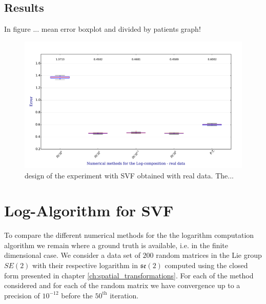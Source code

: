 \subsection{Results}
In figure ... mean error boxplot and divided by patients graph!

\begin{figure}[!ht]
	\hspace{-1.0cm}
	\includegraphics[scale=0.5]{figures/svf_log_composition_boxplot_real_data.pdf}
	\caption{design of the experiment with SVF obtained with real data. The... }
	\label{fig:svf_log_composition_boxplot_real_data}
\end{figure}



\section{Log-Algorithm for SVF}

To compare the different numerical methods for the the logarithm computation algorithm we remain where a ground truth is available, i.e. in the finite dimensional case. We consider a data set of $200$ random matrices in the Lie group $SE(2)$ with their respective logarithm in $\mathfrak{se}(2)$ computed using the closed form presented in chapter \ref{ch:spatial_transformations}. For each of the method considered and for each of the random matrix we have convergence up to a precision of $10^{-12}$ before the $50^{\text{th}}$ iteration.

